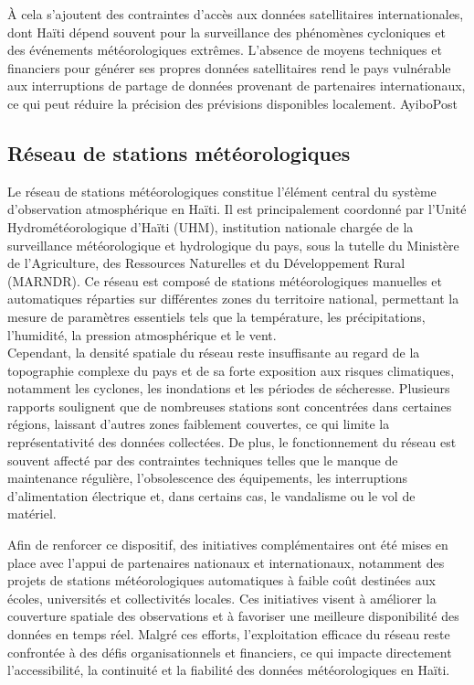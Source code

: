 \noindent À cela s’ajoutent des contraintes d’accès aux données satellitaires internationales, dont Haïti dépend souvent pour la surveillance des phénomènes cycloniques et des événements météorologiques extrêmes. L’absence de moyens techniques et financiers pour générer ses propres données satellitaires rend le pays vulnérable aux interruptions de partage de données provenant de partenaires internationaux, ce qui peut réduire la précision des prévisions disponibles localement. 
AyiboPost

\clearpage
\subsection{Réseau de stations météorologiques}
Le réseau de stations météorologiques constitue l’élément central du système d’observation atmosphérique en Haïti. Il est principalement coordonné par l’Unité Hydrométéorologique d’Haïti (UHM), institution nationale chargée de la surveillance météorologique et hydrologique du pays, sous la tutelle du Ministère de l’Agriculture, des Ressources Naturelles et du Développement Rural (MARNDR). Ce réseau est composé de stations météorologiques manuelles et automatiques réparties sur différentes zones du territoire national, permettant la mesure de paramètres essentiels tels que la température, les précipitations, l’humidité, la pression atmosphérique et le vent.\\

\noindent Cependant, la densité spatiale du réseau reste insuffisante au regard de la topographie complexe du pays et de sa forte exposition aux risques climatiques, notamment les cyclones, les inondations et les périodes de sécheresse. Plusieurs rapports soulignent que de nombreuses stations sont concentrées dans certaines régions, laissant d’autres zones faiblement couvertes, ce qui limite la représentativité des données collectées. De plus, le fonctionnement du réseau est souvent affecté par des contraintes techniques telles que le manque de maintenance régulière, l’obsolescence des équipements, les interruptions d’alimentation électrique et, dans certains cas, le vandalisme ou le vol de matériel.

\noindent Afin de renforcer ce dispositif, des initiatives complémentaires ont été mises en place avec l’appui de partenaires nationaux et internationaux, notamment des projets de stations météorologiques automatiques à faible coût destinées aux écoles, universités et collectivités locales. Ces initiatives visent à améliorer la couverture spatiale des observations et à favoriser une meilleure disponibilité des données en temps réel. Malgré ces efforts, l’exploitation efficace du réseau reste confrontée à des défis organisationnels et financiers, ce qui impacte directement l’accessibilité, la continuité et la fiabilité des données météorologiques en Haïti.

